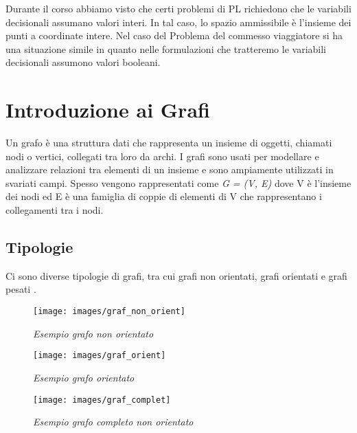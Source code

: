 Durante il corso abbiamo visto che certi problemi di PL richiedono che le  variabili decisionali assumano valori interi. In tal caso, lo spazio ammissibile è l'insieme dei punti a coordinate intere. Nel caso del Problema del commesso viaggiatore si ha una situazione simile in quanto nelle formulazioni che tratteremo le variabili decisionali assumono valori booleani.


\section{Introduzione ai Grafi}
Un grafo è una struttura dati che rappresenta un insieme di oggetti, chiamati nodi o vertici, collegati tra loro da archi. I grafi sono usati per modellare e analizzare relazioni tra elementi di un insieme e sono ampiamente utilizzati in svariati campi. Spesso vengono rappresentati come \textit{G = (V, E)} dove V è l'insieme dei nodi ed E è una famiglia di coppie di elementi di V che rappresentano i collegamenti tra i nodi.

\subsection{Tipologie}
Ci sono diverse tipologie di grafi, tra cui grafi non orientati, grafi orientati e grafi pesati \cite{fischetti}.

\begin{figure}[ht]
	\centering
	\begin{minipage}[b]{0.3\linewidth}
		\centering
		\texttt{[image: images/graf\_non\_orient]}
		\caption{\textit{Esempio grafo non orientato}}
		\label{img:graf_non_orient}
	\end{minipage}
	\hfill
	\begin{minipage}[b]{0.3\linewidth}
		\centering
		\texttt{[image: images/graf\_orient]}
		\caption{\textit{Esempio grafo orientato}}
		\label{img:graf_orient}
	\end{minipage}
	\hfill
	\begin{minipage}[b]{0.3\linewidth}
		\centering
		\texttt{[image: images/graf\_complet]}
		\caption{\textit{Esempio grafo completo non orientato}}
		\label{img:graf_complet}
	\end{minipage}
\end{figure}


